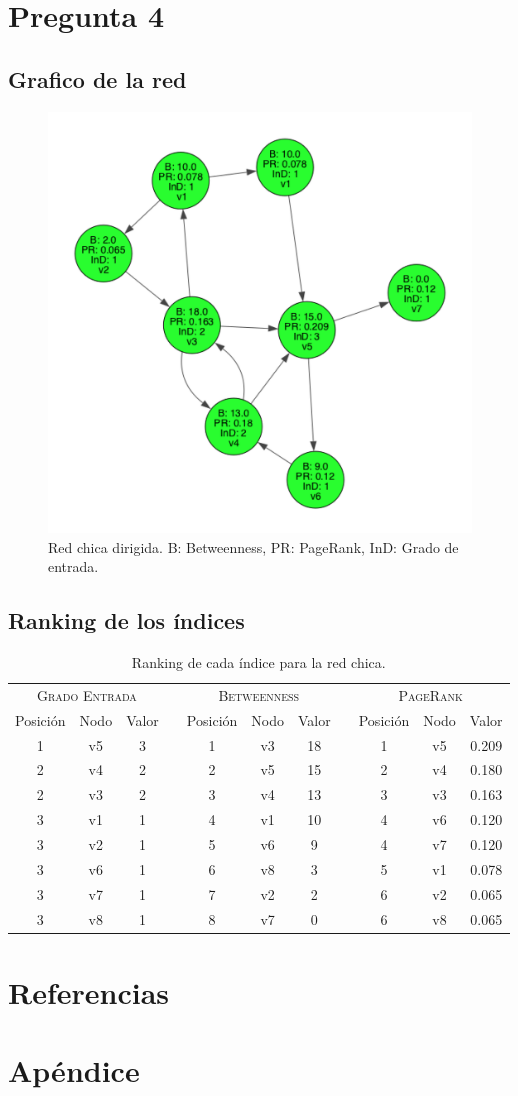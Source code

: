 \documentclass[letterpaper]{article}
\begin{document}
\section{Pregunta 4}

\subsection{Grafico de la red}
\begin{figure}[H]
  \centering
  \includegraphics[width=.5\linewidth]{img/p4.png}
  \caption{Red chica dirigida. B: Betweenness, PR: PageRank, InD: Grado de entrada.}
  \label{red:4}
\end{figure}

\subsection{Ranking de los índices}
\begin{table}[H]
  \centering
  \renewcommand{\arraystretch}{1.1}
  \begin{tabular}{@{}ccccccccccc@{}}
    \toprule
       \multicolumn{3}{c}{\textsc{Grado Entrada}} & \phantom{abc} & \multicolumn{3}{c}{\textsc{Betweenness}} & \phantom{abc} & \multicolumn{3}{c}{\textsc{PageRank}}\\
       \cmidrule{1-3}\cmidrule{5-7}\cmidrule{9-11}
       Posición & Nodo & Valor & & Posición & Nodo & Valor & & Posición & Nodo & Valor\\
       \midrule
      1 & v5 & 3 &&  1 & v3 & 18 && 1 & v5 & 0.209 \\
      2 & v4 & 2 &&  2 & v5 & 15 && 2 & v4 & 0.180 \\
      2 & v3 & 2 &&  3 & v4 & 13 && 3 & v3 & 0.163 \\
      3 & v1 & 1 &&  4 & v1 & 10 && 4 & v6 & 0.120 \\
      3 & v2 & 1 &&  5 & v6 & 9  && 4 & v7 & 0.120 \\
      3 & v6 & 1 &&  6 & v8 & 3  && 5 & v1 & 0.078 \\
      3 & v7 & 1 &&  7 & v2 & 2  && 6 & v2 & 0.065 \\
      3 & v8 & 1 &&  8 & v7 & 0  && 6 & v8 & 0.065 \\
    \bottomrule
  \end{tabular}
  \caption{Ranking de cada índice para la red chica.}
\end{table}


\section{Referencias}
\section{Apéndice}
\end{document}
